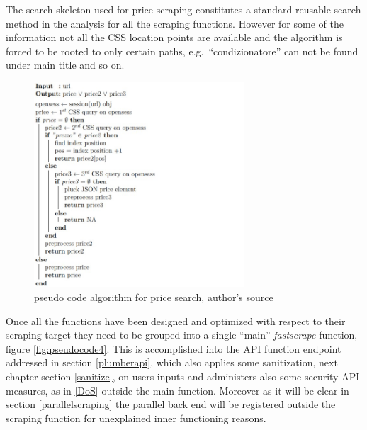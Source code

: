 \documentclass[
  12pt,
  a4paper,
  oneside]{book}
\theoremstyle{definition}
\theoremstyle{definition}
\theoremstyle{definition}
\theoremstyle{remark}
\begin{document}
The search skeleton used for price scraping constitutes a standard reusable search method in the analysis for all the scraping functions. However for some of the information not all the CSS location points are available and the algorithm is forced to be rooted to only certain paths, e.g.~``condizionatore'' can not be found under main title and so on.

\begin{figure}
\centering
\includegraphics[width=0.7\textwidth,height=\textheight]{images/pseudocode_latex/pseudocode_price.jpg}
\caption{\label{fig:pseudocode1}pseudo code algorithm for price search, author's source}
\end{figure}

Once all the functions have been designed and optimized with respect to their scraping target they need to be grouped into a single ``main'' \emph{fastscrape} function, figure \ref{fig:pseudocode4}. This is accomplished into the API function endpoint addressed in section \ref{plumberapi}, which also applies some sanitization, next chapter section \ref{sanitize}, on users inputs and administers also some security API measures, as in \ref{DoS} outside the main function. Moreover as it will be clear in section \ref{parallelscraping} the parallel back end will be registered outside the scraping function for unexplained inner functioning reasons.
\end{document}
